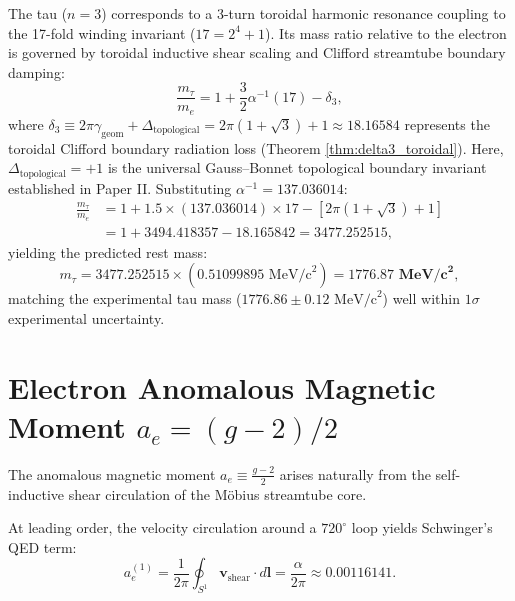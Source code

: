 \documentclass[11pt,a4paper]{article}
\begin{document}
	The tau ($n=3$) corresponds to a 3-turn toroidal harmonic resonance coupling to the 17-fold winding invariant ($17 = 2^4 + 1$). Its mass ratio relative to the electron is governed by toroidal inductive shear scaling and Clifford streamtube boundary damping:
	\begin{equation}
		\frac{m_\tau}{m_e} = 1 + \frac{3}{2}\alpha^{-1} (17) - \delta_3,
		\label{eq:tau_mass_formula}
	\end{equation}
	where $\delta_3 \equiv 2\pi \gamma_{\text{geom}} + \Delta_{\text{topological}} = 2\pi(1 + \sqrt{3}) + 1 \approx 18.16584$ represents the toroidal Clifford boundary radiation loss (Theorem \ref{thm:delta3_toroidal}). Here, $\Delta_{\text{topological}} = +1$ is the universal Gauss--Bonnet topological boundary invariant established in Paper II. Substituting $\alpha^{-1} = 137.036014$:
	\begin{align}
		\frac{m_\tau}{m_e} &= 1 + 1.5 \times (137.036014) \times 17 - \left[ 2\pi(1 + \sqrt{3}) + 1 \right] \nonumber \\
		&= 1 + 3494.418357 - 18.165842 = \mathbf{3477.252515},
		\label{eq:tau_mass_ratio_numerical_eval}
	\end{align}
	yielding the predicted rest mass:
	\begin{equation}
		m_\tau = 3477.252515 \times (0.51099895 \text{ MeV/c}^2) = \mathbf{1776.87 \text{ MeV/c}^2},
		\label{eq:tau_mass_final_result}
	\end{equation}
	matching the experimental tau mass ($1776.86 \pm 0.12 \text{ MeV/c}^2$) well within $1\sigma$ experimental uncertainty.
	
	\section{Electron Anomalous Magnetic Moment $a_e = (g-2)/2$}
	\label{sec:g_minus_2}
	
	The anomalous magnetic moment $a_e \equiv \frac{g-2}{2}$ arises naturally from the self-inductive shear circulation of the Möbius streamtube core.
	
	At leading order, the velocity circulation around a $720^\circ$ loop yields Schwinger's QED term:
	\begin{equation}
		a_e^{(1)} = \frac{1}{2\pi} \oint_{S^1} \mathbf{v}_{\text{shear}} \cdot d\mathbf{l} = \frac{\alpha}{2\pi} \approx 0.00116141.
		\label{eq:schwinger_leading_order}
	\end{equation}
	
\end{document}
